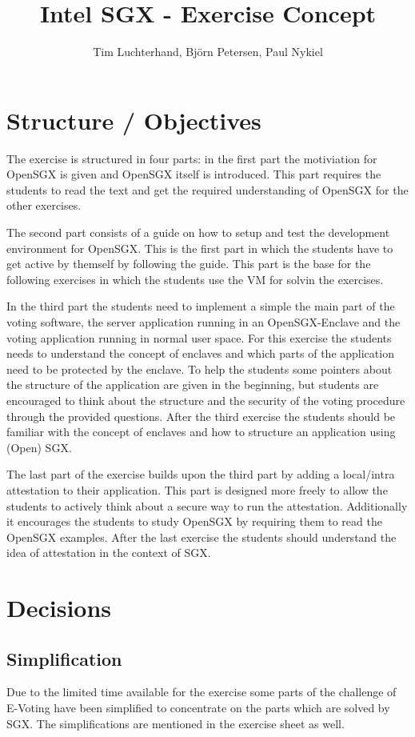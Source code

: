 \documentclass[DIN, pagenumber=false, fontsize=11pt, parskip=half]{scrartcl}
\title{Intel SGX - Exercise Concept}
\author{Tim Luchterhand, Björn Petersen, Paul Nykiel}
\begin{document}
    \maketitle
    \section{Structure / Objectives}
    The exercise is structured in four parts: in the first part the motiviation for OpenSGX is given and OpenSGX
    itself is introduced. This part requires the students to read the text and get the required understanding of
    OpenSGX for the other exercises.

    The second part consists of a guide on how to setup and test the development environment for OpenSGX. This is the
    first part in which the students have to get active by themself by following the guide. This part is the base
    for the following exercises in which the students use the VM for solvin the exercises.

    In the third part the students need to implement a simple the main part of the voting software, the server
    application running in an OpenSGX-Enclave and the voting application running in normal user space.
    For this exercise the students needs to understand the concept of enclaves and which parts of the application
    need to be protected by the enclave. To help the students some pointers about the structure of the application
    are given in the beginning, but students are encouraged to think about the structure and the security of the
    voting procedure through the provided questions. After the third exercise the students should be familiar with
    the concept of enclaves and how to structure an application using (Open) SGX.

    The last part of the exercise builds upon the third part by adding a local/intra attestation to their application.
    This part is designed more freely to allow the students to actively think about a secure way to run the attestation.
    Additionally it encourages the students to study OpenSGX by requiring them to read the OpenSGX examples.
    After the last exercise the students should understand the idea of attestation in the context of SGX.
    
    \section{Decisions}
    \subsection{Simplification}
    Due to the limited time available for the exercise some parts of the challenge of
    E-Voting have been simplified to concentrate on the parts which are solved by SGX.
    The simplifications are mentioned in the exercise sheet as well.
\end{document}

